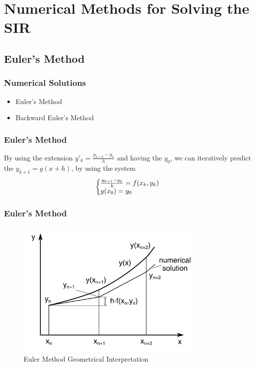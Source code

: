 \documentclass{beamer}
\makeatletter
\newenvironment{system}%
{\left\lbrace\begin{array}{@{}l@{}}}%
{\end{array}\right.}
\makeatother
\begin{document}
\section{Numerical Methods for Solving the SIR}
\subsection{Euler's Method}

\begin{frame}\frametitle{Numerical Solutions}
\begin{itemize}
\item Euler's Method
\item Backward Euler's Method
\end{itemize}
\end{frame}

\begin{frame}\frametitle{Euler's Method}
    By using the extension $y'_k=\frac{y_{k+h}-y_k}{h}$ and having the
$y_0$, we can iteratively predict the $y_{k+1}=y(x+h)$, by using the system
\vspace{1.5cm}
\large
\begin{equation*}
    \begin{system}
        \frac{y_{k+1}-y_k}{h}=f(x_k, y_k)
        \\
        y(x_0)=y_0
    \end{system}
\end{equation*}

\end{frame}

\begin{frame}\frametitle{Euler's Method}
    \begin{figure}
        \caption{Euler Method Geometrical Interpretation}
        \centering
        \includegraphics[width=9cm]{Figure_Euler_Geom.png}
    \end{figure}
\end{frame}
\end{document}
